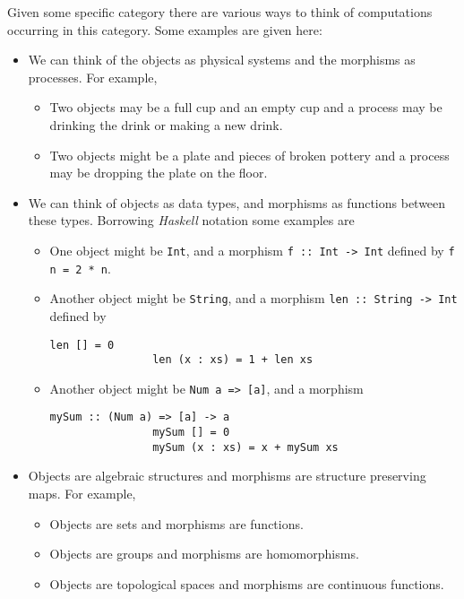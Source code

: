 \documentclass[fleqn]{NotesClass}
\newcommand{\Haskell}{\textit{Haskell}}
\begin{document}
    Given some specific category there are various ways to think of computations occurring in this category.
    Some examples are given here:
    \begin{itemize}
        \item We can think of the objects as physical systems and the morphisms as processes.
        For example,
        \begin{itemize}
            \item Two objects may be a full cup and an empty cup and a process may be drinking the drink or making a new drink.
            \item Two objects might be a plate and pieces of broken pottery and a process may be dropping the plate on the floor.
        \end{itemize}
        \item We can think of objects as data types, and morphisms as functions between these types.
        Borrowing \Haskell{} notation some examples are
        \begin{itemize}
            \item One object might be \lstinline|Int|, and a morphism \lstinline[style=haskell]|f :: Int -> Int| defined by \lstinline|f n = 2 * n|.
            \item Another object might be \lstinline|String|, and a morphism \lstinline|len :: String -> Int| defined by
            \begin{lstlisting}[style=haskell, gobble=16]
                len [] = 0
                len (x : xs) = 1 + len xs
            \end{lstlisting}
            \item Another object might be \lstinline[style=haskell]|Num a => [a]|, and a morphism
            \begin{lstlisting}[style=haskell, gobble=16]
                mySum :: (Num a) => [a] -> a
                mySum [] = 0
                mySum (x : xs) = x + mySum xs
            \end{lstlisting}
        \end{itemize}
        \item Objects are algebraic structures and morphisms are structure preserving maps.
        For example,
        \begin{itemize}
            \item Objects are sets and morphisms are functions.
            \item Objects are groups and morphisms are homomorphisms.
            \item Objects are topological spaces and morphisms are continuous functions.

\end{itemize}
\end{itemize}
\end{document}

